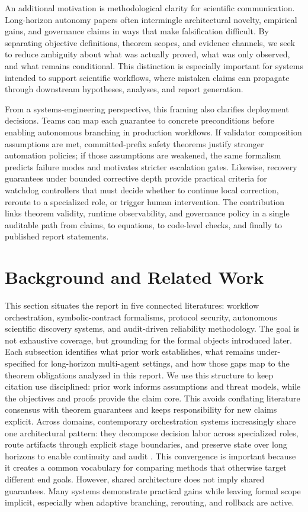 \documentclass{article} %
\begin{document}
An additional motivation is methodological clarity for scientific communication. Long-horizon autonomy papers often intermingle architectural novelty, empirical gains, and governance claims in ways that make falsification difficult. By separating objective definitions, theorem scopes, and evidence channels, we seek to reduce ambiguity about what was actually proved, what was only observed, and what remains conditional. This distinction is especially important for systems intended to support scientific workflows, where mistaken claims can propagate through downstream hypotheses, analyses, and report generation.

From a systems-engineering perspective, this framing also clarifies deployment decisions. Teams can map each guarantee to concrete preconditions before enabling autonomous branching in production workflows. If validator composition assumptions are met, committed-prefix safety theorems justify stronger automation policies; if those assumptions are weakened, the same formalism predicts failure modes and motivates stricter escalation gates. Likewise, recovery guarantees under bounded corrective depth provide practical criteria for watchdog controllers that must decide whether to continue local correction, reroute to a specialized role, or trigger human intervention. The contribution links theorem validity, runtime observability, and governance policy in a single auditable path from claims, to equations, to code-level checks, and finally to published report statements.

\section{Background and Related Work}
\label{sec:related}
This section situates the report in five connected literatures: workflow orchestration, symbolic-contract formalisms, protocol security, autonomous scientific discovery systems, and audit-driven reliability methodology. The goal is not exhaustive coverage, but grounding for the formal objects introduced later. Each subsection identifies what prior work establishes, what remains under-specified for long-horizon multi-agent settings, and how those gaps map to the theorem obligations analyzed in this report.
We use this structure to keep citation use disciplined: prior work informs assumptions and threat models, while the objectives and proofs provide the claim core. This avoids conflating literature consensus with theorem guarantees and keeps responsibility for new claims explicit.
Across domains, contemporary orchestration systems increasingly share one architectural pattern: they decompose decision labor across specialized roles, route artifacts through explicit stage boundaries, and preserve state over long horizons to enable continuity and audit \citep{song2026,chang2025,wang2025b,sun2025,hou2025,zhang2025,dong2025}. This convergence is important because it creates a common vocabulary for comparing methods that otherwise target different end goals. However, shared architecture does not imply shared guarantees. Many systems demonstrate practical gains while leaving formal scope implicit, especially when adaptive branching, rerouting, and rollback are active.
\end{document}
